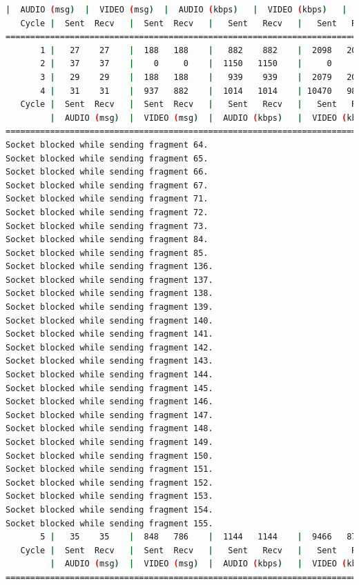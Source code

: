 \begin{lstlisting}[language=bash,basicstyle=\ttfamily\tiny]
         |  AUDIO (msg)  |  VIDEO (msg)  |  AUDIO (kbps)   |  VIDEO (kbps)   |     CPU (%) 
   Cycle |  Sent  Recv   |  Sent  Recv   |   Sent   Recv   |   Sent   Recv   | Program System
================================================================================================
       1 |   27    27    |  188   188    |   882    882    |  2098   2098    |  17      0       
       2 |   37    37    |    0     0    |  1150   1150    |     0      0    |  35     76       
       3 |   29    29    |  188   188    |   939    939    |  2079   2081    |  31     78       
       4 |   31    31    |  937   882    |  1014   1014    | 10470   9853    |  22     73       
   Cycle |  Sent  Recv   |  Sent  Recv   |   Sent   Recv   |   Sent   Recv   | Program System
         |  AUDIO (msg)  |  VIDEO (msg)  |  AUDIO (kbps)   |  VIDEO (kbps)   |     CPU (%) 
===========================================================================================
Socket blocked while sending fragment 64.
Socket blocked while sending fragment 65.
Socket blocked while sending fragment 66.
Socket blocked while sending fragment 67.
Socket blocked while sending fragment 71.
Socket blocked while sending fragment 72.
Socket blocked while sending fragment 73.
Socket blocked while sending fragment 84.
Socket blocked while sending fragment 85.
Socket blocked while sending fragment 136.
Socket blocked while sending fragment 137.
Socket blocked while sending fragment 138.
Socket blocked while sending fragment 139.
Socket blocked while sending fragment 140.
Socket blocked while sending fragment 141.
Socket blocked while sending fragment 142.
Socket blocked while sending fragment 143.
Socket blocked while sending fragment 144.
Socket blocked while sending fragment 145.
Socket blocked while sending fragment 146.
Socket blocked while sending fragment 147.
Socket blocked while sending fragment 148.
Socket blocked while sending fragment 149.
Socket blocked while sending fragment 150.
Socket blocked while sending fragment 151.
Socket blocked while sending fragment 152.
Socket blocked while sending fragment 153.
Socket blocked while sending fragment 154.
Socket blocked while sending fragment 155.
       5 |   35    35    |  848   786    |  1144   1144    |  9466   8773    |  24     73       
   Cycle |  Sent  Recv   |  Sent  Recv   |   Sent   Recv   |   Sent   Recv   | Program System
         |  AUDIO (msg)  |  VIDEO (msg)  |  AUDIO (kbps)   |  VIDEO (kbps)   |     CPU (%) 
===========================================================================================

\end{lstlisting}
